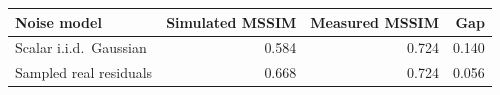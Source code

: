 \begin{tabular}{lrrr}
\hline
Noise model & Simulated MSSIM & Measured MSSIM & Gap \\
\hline
Scalar i.i.d.\ Gaussian & 0.584 & 0.724 & 0.140 \\
Sampled real residuals & 0.668 & 0.724 & 0.056 \\
\hline
\end{tabular}
